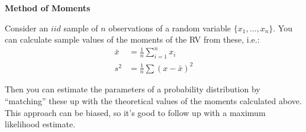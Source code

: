 \documentclass[12pt,xcolor=svgnames]{beamer}
\newcommand{\rd}{\color{red}}
\newcommand{\bl}{\color{blue}}
\newcommand{\theme}{\color{FireBrick}}
\newcommand{\ds}[1]{\mathds{#1}}
\newcommand{\sk}{\vspace{.4cm}}
\newcommand{\nochap}{\vspace{0.5cm}}
\newcommand{\nsk}{\vspace{-.4cm}}
\newcommand{\chap}[1]{{\theme \Large \bf #1} \sk}
\newcommand{\E}{\ds{E}}
\begin{document}
\begin{frame}
\chap{Method of Moments}

Consider an $iid$ sample of $n$ observations of a  random variable
$\{x_1,\ldots,x_n\}$. You can calculate sample values of the moments of the RV from these, i.e.:
\nsk
\begin{align*}
\bar{x} & =\frac{1}{n} \sum_{i=1}^n x_i \\
s^2 & = \frac{1}{n} \sum (x-\bar{x})^2
\end{align*}

Then you can estimate the parameters of a probability distribution by ``matching'' these up with the theoretical values of the moments calculated above. This approach can be biased, so it's good to follow up with a maximum likelihood estimate.

\end{frame}

\end{document}
